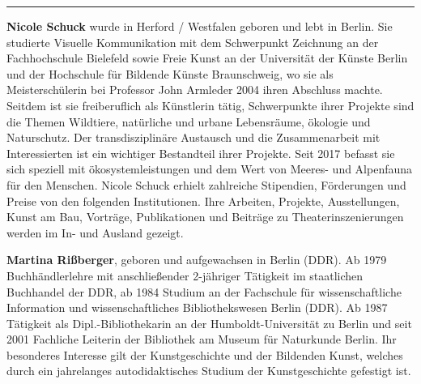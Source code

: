 \begin{center}\rule{0.5\linewidth}{0.5pt}\end{center}

\textbf{Nicole Schuck} wurde in Herford / Westfalen geboren und lebt in
Berlin. Sie studierte Visuelle Kommunikation mit dem Schwerpunkt
Zeichnung an der Fachhochschule Bielefeld sowie Freie Kunst an der
Universität der Künste Berlin und der Hochschule für Bildende Künste
Braunschweig, wo sie als Meisterschülerin bei Professor John Armleder
2004 ihren Abschluss machte. Seitdem ist sie freiberuflich als
Künstlerin tätig, Schwerpunkte ihrer Projekte sind die Themen Wildtiere,
natürliche und urbane Lebensräume, ökologie und Naturschutz. Der
transdisziplinäre Austausch und die Zusammenarbeit mit Interessierten
ist ein wichtiger Bestandteil ihrer Projekte. Seit 2017 befasst sie sich
speziell mit ökosystemleistungen und dem Wert von Meeres- und Alpenfauna
für den Menschen. Nicole Schuck erhielt zahlreiche Stipendien,
Förderungen und Preise von den folgenden Institutionen. Ihre Arbeiten,
Projekte, Ausstellungen, Kunst am Bau, Vorträge, Publikationen und
Beiträge zu Theaterinszenierungen werden im In- und Ausland gezeigt.

\textbf{Martina Rißberger}, geboren und aufgewachsen in Berlin (DDR). Ab
1979 Buchhändlerlehre mit anschließender 2-jähriger Tätigkeit im
staatlichen Buchhandel der DDR, ab 1984 Studium an der Fachschule für
wissenschaftliche Information und wissenschaftliches Bibliothekswesen
Berlin (DDR). Ab 1987 Tätigkeit als Dipl.-Bibliothekarin an der
Humboldt-Universität zu Berlin und seit 2001 Fachliche Leiterin der
Bibliothek am Museum für Naturkunde Berlin. Ihr besonderes Interesse
gilt der Kunstgeschichte und der Bildenden Kunst, welches durch ein
jahrelanges autodidaktisches Studium der Kunstgeschichte gefestigt ist.
